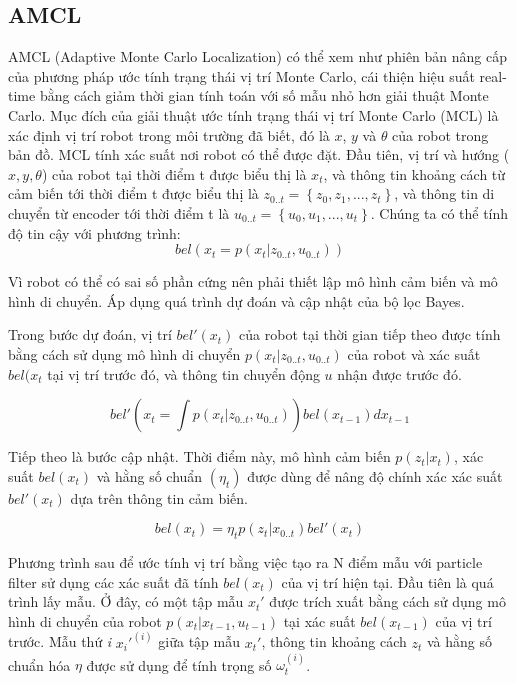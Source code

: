 {{\subsection{AMCL}
AMCL (Adaptive Monte Carlo Localization) có thể xem như phiên bản nâng cấp của phương pháp ước tính trạng thái vị trí Monte Carlo, cái thiện hiệu suất real-time bằng cách giảm thời gian tính toán với số mẫu nhỏ hơn giải thuật Monte Carlo.
Mục đích của giải thuật ước tính trạng thái vị trí Monte Carlo (MCL) là xác định vị trí robot trong môi trường đã biết, đó là $x$, $y$ và $\theta$ của robot trong bản đồ.
MCL tính xác suất nơi robot có thể được đặt. Đầu tiên, vị trí và hướng ($x, y, \theta$) của robot tại thời điểm t được biểu thị là ${x}_{t}$,
và thông tin khoảng cách từ cảm biến tới thời điểm t được biểu thị là ${z}_{0..t} = \left\{{z}_{0}, {z}_{1}, ..., {z}_{t}\right\}$, và thông tin di chuyển từ encoder tới thời điểm t là ${u}_{0..t} = \left\{{u}_{0}, {u}_{1}, ..., {u}_{t}\right\}$. Chúng ta có thể tính độ tin cậy với phương trình:
\begin{equation}
  bel({x}_{t} = p\left({x}_ {t}|{z}_{0..t}, {u}_{0..t}\right))
\end{equation}

Vì robot có thể có sai số phần cứng nên phải thiết lập mô hình cảm biến và mô hình di chuyển. Áp dụng quá trình dự đoán và cập nhật của bộ lọc Bayes.

Trong bước dự đoán, vị trí $bel'\left({x}_{t}\right)$ của robot tại thời gian tiếp theo được tính bằng cách sử dụng mô hình di chuyển $p\left({x}_ {t}|{z}_{0..t}, {u}_{0..t}\right)$ của robot và xác suất $bel({x}_{t}$ tại vị trí trước đó, và thông tin chuyển động $u$ nhận được trước đó.

\begin{equation}
  bel'({x}_{t} = \int p\left({x}_ {t}|{z}_{0..t}, {u}_{0..t}\right))bel\left({x}_{t-1}\right)d{x}_{t-1}
\end{equation}

Tiếp theo là bước cập nhật. Thời điểm này, mô hình cảm biến $p\left({z}_{t}|{x}_{t}\right)$, xác suất $bel\left({x}_{t}\right)$ và hằng số chuẩn $\left({\eta}_{t}\right)$ được dùng để nâng độ chính xác xác suất $bel'\left({x}_{t}\right)$ dựa trên thông tin cảm biến.

\begin{equation}
  bel({x}_{t}) = {\eta}_{t} p\left({z}_ {t}|{x}_{0..t}\right)bel'({x}_{t})
\end{equation}

Phương trình sau để ước tính vị trí bằng việc tạo ra N điểm mẫu với particle filter sử dụng các xác suất đã tính $bel({x}_{t})$ của vị trí hiện tại. Đầu tiên là quá trình lấy mẫu. Ở đây, có một tập mẫu ${x}_{t}'$ được trích xuất bằng cách sử dụng mô hình di chuyển của robot $p\left({x}_{t}|{x}_{t-1}, {u}_{t-1}\right)$ tại xác suất $bel({x}_{t-1})$ của vị trí trước. Mẫu thứ \textit{i} ${{x}_{i}'}^{(i)}$ giữa tập mẫu ${x}_{t}'$, thông tin khoảng cách ${z}_{t}$ và hằng số chuẩn hóa $\eta$ được sử dụng để tính trọng số ${\omega}_{t}^{(i)}$.

}}
